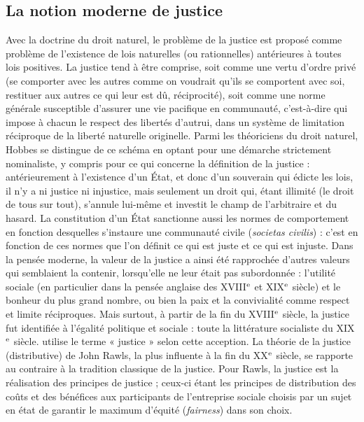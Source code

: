\subsection{La notion moderne de justice}

Avec la doctrine du droit naturel, le
problème de la justice est proposé comme
problème de l'existence de lois naturelles
(ou rationnelles) antérieures à toutes lois
positives. La justice tend à être comprise,
soit comme une vertu d'ordre privé (se
comporter avec les autres comme on voudrait qu’ils se comportent avec soi, restituer aux autres ce qui leur est dû,
réciprocité), soit comme une norme générale susceptible d'assurer une vie pacifique en communauté, c’est-à-dire qui
impose à chacun le respect des libertés
d'autrui, dans un système de limitation
réciproque de la liberté naturelle originelle. Parmi les théoriciens du droit naturel, Hobbes se distingue de ce schéma en
optant pour une démarche strictement
nominaliste, y compris pour ce qui
concerne la définition de la justice : antérieurement à l’existence d’un État, et
donc d’un souverain qui édicte les lois, il
n’y a ni justice ni injustice, mais seulement
un droit qui, étant illimité (le droit de tous
sur tout), s’annule lui-même et investit le
champ de l'arbitraire et du hasard. La
constitution d’un État sanctionne aussi les
normes de comportement en fonction
desquelles s’instaure une communauté
civile ({\it societas civilis}) : c’est en fonction
de ces normes que l’on définit ce qui est
juste et ce qui est injuste. Dans la pensée
moderne, la valeur de la justice a ainsi été
rapprochée d’autres valeurs qui semblaient la contenir, lorsqu'elle ne leur
était pas subordonnée : l’utilité sociale (en
particulier dans la pensée anglaise des
{\footnotesize XVIII}$^{\text e}$ et {\footnotesize XIX}$^{\text e}$ siècle) et le bonheur du plus
grand nombre, ou bien la paix et la convivialité comme respect et limite réciproques. Mais surtout, à partir de la fin du
{\footnotesize XVIII}$^{\text e}$ siècle, la justice fut identifiée à l'égalité
politique et sociale : toute la littérature
socialiste du {\footnotesize XIX}$^{\text e}$ siècle. utilise le terme « justice » selon cette acception. La théorie de
la justice (distributive) de John Rawls, la
plus influente à la fin du {\footnotesize XX}$^{\text e}$ siècle, se rapporte au contraire à la tradition classique
%
de la justice. Pour Rawls, la justice est la
réalisation des principes de justice ; ceux-ci étant les principes de distribution des
coûts et des bénéfices aux participants de
l’entreprise sociale choisis par un sujet en
état de garantir le maximum d'équité
({\it fairness}) dans son choix.


 

